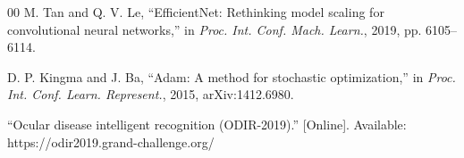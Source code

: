 \documentclass[journal,twoside,web]{ieeecolor}
\begin{document}
\begin{thebibliography}{00}
M. Tan and Q. V. Le, ``EfficientNet: Rethinking model scaling for convolutional neural networks,'' in \emph{Proc. Int. Conf. Mach. Learn.}, 2019, pp. 6105--6114.

D. P. Kingma and J. Ba, ``Adam: A method for stochastic optimization,'' in \emph{Proc. Int. Conf. Learn. Represent.}, 2015, arXiv:1412.6980.

``Ocular disease intelligent recognition (ODIR-2019).'' [Online]. Available: https://odir2019.grand-challenge.org/
\end{thebibliography}
\end{document}
